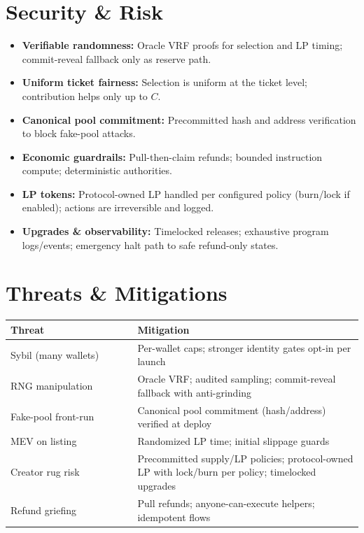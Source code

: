 \documentclass[10pt,twocolumn]{article}
\begin{document}
\section*{Security \& Risk}
\begin{itemize}
  \item \textbf{Verifiable randomness:} Oracle VRF proofs for selection and LP timing; commit-reveal fallback only as reserve path.
  \item \textbf{Uniform ticket fairness:} Selection is uniform at the ticket level; contribution helps only up to $C$.
  \item \textbf{Canonical pool commitment:} Precommitted hash and address verification to block fake-pool attacks.
  \item \textbf{Economic guardrails:} Pull-then-claim refunds; bounded instruction compute; deterministic authorities.
  \item \textbf{LP tokens:} Protocol-owned LP handled per configured policy (burn/lock if enabled); actions are irreversible and logged.
  \item \textbf{Upgrades \& observability:} Timelocked releases; exhaustive program logs/events; emergency halt path to safe refund-only states.
\end{itemize}

\section*{Threats \& Mitigations}
\begin{tabularx}{\linewidth}{L{0.36\linewidth} L{0.64\linewidth}}
\toprule
\textbf{Threat} & \textbf{Mitigation} \\
\midrule
Sybil (many wallets) & Per-wallet caps; stronger identity gates opt-in per launch \\
RNG manipulation & Oracle VRF; audited sampling; commit-reveal fallback with anti-grinding \\
Fake-pool front-run & Canonical pool commitment (hash/address) verified at deploy \\
MEV on listing & Randomized LP time; initial slippage guards \\
Creator rug risk & Precommitted supply/LP policies; protocol-owned LP with lock/burn per policy; timelocked upgrades \\
Refund griefing & Pull refunds; anyone-can-execute helpers; idempotent flows \\
\bottomrule
\end{tabularx}
\end{document}
